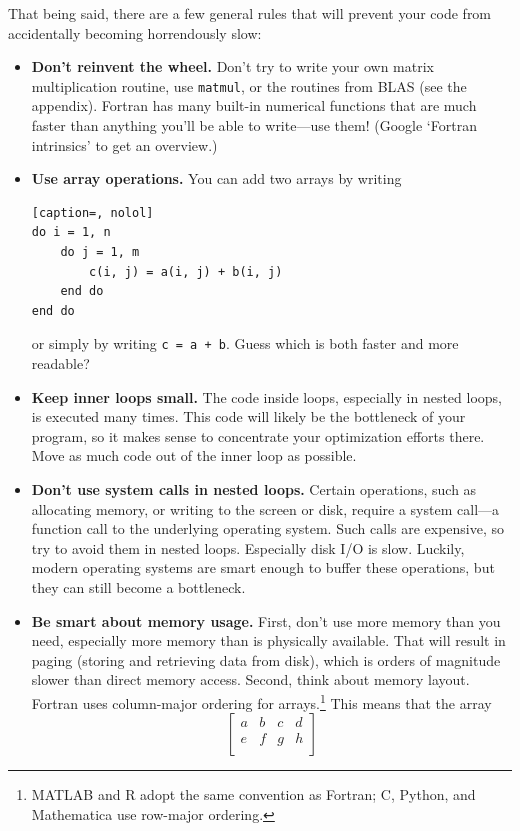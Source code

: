\documentclass[openany,oneside]{report}
\begin{document}
That being said, there are a few general rules that will prevent your code from accidentally becoming horrendously slow:
\begin{itemize}
  \item\textbf{Don't reinvent the wheel.} Don't try to write your own matrix multiplication routine, use \texttt{matmul}, or the routines from BLAS (see the  appendix).
    Fortran has many built-in numerical functions that are much faster than anything you'll be able to write---use them! (Google `Fortran intrinsics' to get an overview.)
  \item\textbf{Use array operations.} You can add two arrays by writing
\begin{lstlisting}[caption=, nolol]
do i = 1, n
    do j = 1, m
        c(i, j) = a(i, j) + b(i, j)
    end do
end do
\end{lstlisting}
    or simply by writing \texttt{c = a + b}.
    Guess which is both faster and more readable?
  \item\textbf{Keep inner loops small.} The code inside loops, especially in nested loops, is executed many times.
    This code will likely be the bottleneck of your program, so it makes sense to concentrate your optimization efforts there.
    Move as much code out of the inner loop as possible.
  \item\textbf{Don't use system calls in nested loops.} Certain operations, such as allocating memory, or writing to the screen or disk, require a system call---a function call to the underlying operating system.
    Such calls are expensive, so try to avoid them in nested loops.
    Especially disk I/O is slow.
    Luckily, modern operating systems are smart enough to buffer these operations, but they can still become a bottleneck.
  \item\textbf{Be smart about memory usage.} First, don't use more memory than you need, especially more memory than is physically available.
    That will result in paging (storing and retrieving data from disk), which is orders of magnitude slower than direct memory access.
    Second, think about memory layout.
    Fortran uses column-major ordering for arrays.\footnote{MATLAB and R adopt the same convention as Fortran; C, Python, and Mathematica use row-major ordering.}
    This means that the array
    \begin{equation*}
    \begin{bmatrix}
        a & b & c & d \\
        e & f & g & h \\

\end{bmatrix}
\end{equation*}
\end{itemize}
\end{document}
